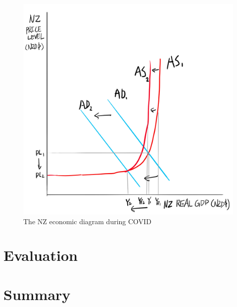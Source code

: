 \documentclass[a4paper,12pt]{article}
\begin{document}
\begin{figure}[H]
    \centering
    \includegraphics[scale=0.7]{assets/asad.png}
    \caption{The NZ economic diagram during COVID}
    \label{fig:asad}
\end{figure}

\section*{Evaluation}


\section*{Summary}

\end{document}
